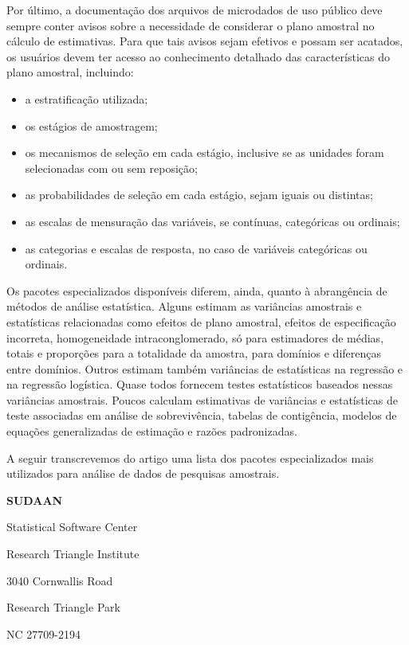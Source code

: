 \documentclass[]{book}
\numberwithin{example}{chapter}
\numberwithin{remark}{chapter}
\numberwithin{definition}{chapter}
\begin{document}
Por último, a documentação dos arquivos de microdados de uso público
deve sempre conter avisos sobre a necessidade de considerar o plano
amostral no cálculo de estimativas. Para que tais avisos sejam efetivos
e possam ser acatados, os usuários devem ter acesso ao conhecimento
detalhado das características do plano amostral, incluindo:

\begin{itemize}
\item
  a estratificação utilizada;
\item
  os estágios de amostragem;
\item
  os mecanismos de seleção em cada estágio, inclusive se as unidades
  foram selecionadas com ou sem reposição;
\item
  as probabilidades de seleção em cada estágio, sejam iguais ou
  distintas;
\item
  as escalas de mensuração das variáveis, se contínuas, categóricas ou
  ordinais;
\item
  as categorias e escalas de resposta, no caso de variáveis categóricas
  ou ordinais.
\end{itemize}

Os pacotes especializados disponíveis diferem, ainda, quanto à
abrangência de métodos de análise estatística. Alguns estimam as
variâncias amostrais e estatísticas relacionadas como efeitos de plano
amostral, efeitos de especificação incorreta, homogeneidade
intraconglomerado, só para estimadores de médias, totais e proporções
para a totalidade da amostra, para domínios e diferenças entre domínios.
Outros estimam também variâncias de estatísticas na regressão e na
regressão logística. Quase todos fornecem testes estatísticos baseados
nessas variâncias amostrais. Poucos calculam estimativas de variâncias e
estatísticas de teste associadas em análise de sobrevivência, tabelas de
contigência, modelos de equações generalizadas de estimação e razões
padronizadas.

A seguir transcrevemos do artigo \citep{Lepkowski} uma lista dos pacotes
especializados mais utilizados para análise de dados de pesquisas
amostrais.

\textbf{SUDAAN}

Statistical Software Center

Research Triangle Institute

3040 Cornwallis Road

Research Triangle Park

NC 27709-2194
\end{document}
